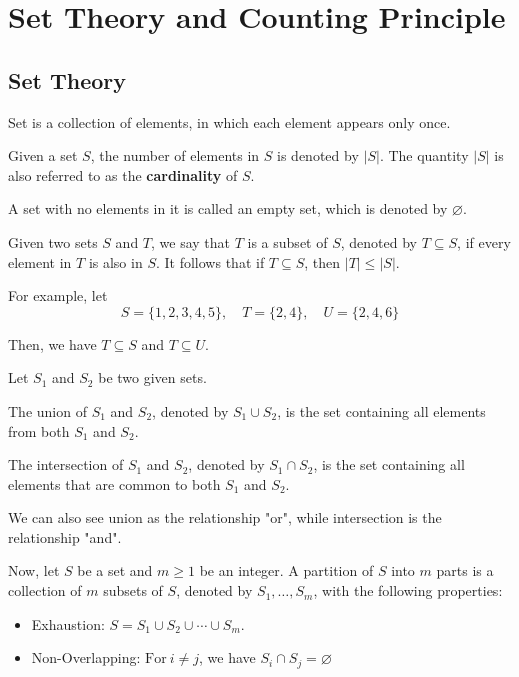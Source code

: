 \chapter{Set Theory and Counting Principle}

\section{Set Theory}

\begin{definition}
    Set is a collection of elements, in which each element appears only once. 
\end{definition}

\begin{definition}
    Given a set \(S\), the number of elements in \(S\) is denoted by \(\vert S \vert \). The quantity \(\vert S \vert \) is also referred to as the \textbf{cardinality} of \(S\).
\end{definition}

A set with no elements in it is called an empty set, which is denoted by \(\varnothing\).

\begin{definition}
    Given two sets \(S\) and \(T\), we say that \(T\) is a subset of \(S\), denoted by \(T \subseteq S\), if every element in \(T\) is also in \(S\). It follows that if \(T \subseteq S\), then \(\vert T \vert \leq \vert S \vert \). 
\end{definition}
For example, let
\[
    S = \{1, 2, 3, 4, 5\},\quad T = \{2, 4\}, \quad U = \{2, 4, 6\}
\]

Then, we have \(T \subseteq S\) and \(T \subseteq U\).

\begin{definition}
    Let \(S_1\) and \(S_2\) be two given sets. 

    The union of \(S_1\) and \(S_2\), denoted by \(S_1 \cup S_2\), is the set containing all elements from both \(S_1\) and \(S_2\). 

    The intersection of \(S_1\) and \(S_2\), denoted by \(S_1 \cap S_2\), is the set containing all elements that are common to both \(S_1\) and \(S_2\). 
\end{definition}
We can also see union as the relationship "or", while intersection is the relationship "and".

\begin{definition}
    Now, let \(S\) be a set and \(m \geq 1\) be an integer. A partition of \(S\) into \(m\) parts is a collection of \(m\) subsets of \(S\), denoted by \(S_1, \dots, S_m\), with the following properties:
    \begin{itemize}
        \item Exhaustion: \(S = S_1 \cup S_2 \cup \cdots \cup S_m.\)
        \item Non-Overlapping: \(\text{For}\ i \neq j\), we have \(S_i \cap S_j = \varnothing\)
    \end{itemize}
\end{definition}

